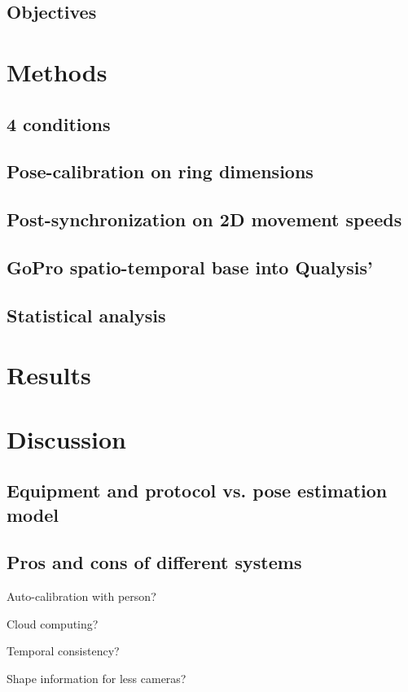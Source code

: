 \subsection{Objectives}
\blindtext


\section{Methods}
\subsection{4 conditions}
\blindtext

\subsection{Pose-calibration on ring dimensions}
\blindtext

\subsection{Post-synchronization on 2D movement speeds}
\blindtext

\subsection{GoPro spatio-temporal base into Qualysis'}
\blindtext

\subsection{Statistical analysis}
\blindtext


\section{Results}
\blindtext


\section{Discussion}
\subsection{Equipment and protocol vs. pose estimation model}
\blindtext

\subsection{Pros and cons of different systems}

Auto-calibration with person?

Cloud computing?

Temporal consistency?

Shape information for less cameras?

\blindtext
